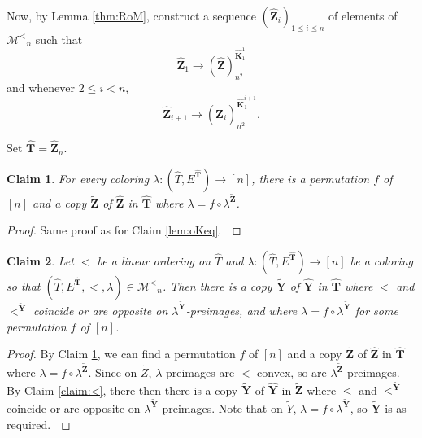 \documentclass[reqno]{amsart}
\newtheorem{claimm}{Claim}
\begin{document}
Now, by Lemma \ref{thm:RoM}, construct a sequence $({\widehat{\textbf{{Z}}}}_i)_{1\leq i \leq n}$ of elements of ${\mathcal{M}^<}_n$ such that \[ {\widehat{\textbf{{Z}}}}_1 {\longrightarrow {{({\widehat{\textbf{{Z}}}})}}^{{{\widehat{\textbf{{K}}}}_1 ^1}}_{{n^2}}} \] and whenever $2\leq i < n$, \[ {\widehat{\textbf{{Z}}}}_{i+1} {\longrightarrow {{({\widehat{\textbf{{Z}}}}_i)}}^{{{\widehat{\textbf{{K}}}}_1 ^{i+1}}}_{{n^2}}}. \] 

Set ${\widehat{\textbf{{T}}}}={\widehat{\textbf{{Z}}}}_{n}$. 

\begin{claimm}
\label{claim:oMeq} 
For every coloring $\lambda : {{(\hat{T}, E^{{\widehat{\textbf{{T}}}}})} \longrightarrow {[n]}}$, there is a permutation $f$ of $[n]$ and a copy ${\widetilde{\textbf{{Z}}}}$ of ${\widehat{\textbf{{Z}}}}$ in ${\widehat{\textbf{{T}}}}$ where $\lambda = f \circ \lambda^{{\widetilde{\textbf{{Z}}}}}$.  
\end{claimm}

\begin{proof} Same proof as for Claim \ref{lem:oKeq}. $\qedhere$ \end{proof}

\begin{claimm}
Let $<$ be a linear ordering on $\hat{T}$ and $\lambda : {{(\hat{T}, E^{{\widehat{\textbf{{T}}}}})} \longrightarrow {[n]}}$ be a coloring so that $(\hat{T}, E^{{\widehat{\textbf{{T}}}}}, <, \lambda) \in {\mathcal{M}^<} _n$. Then there is a copy ${\widetilde{\textbf{{Y}}}}$ of ${\widehat{\textbf{{Y}}}}$ in ${\widehat{\textbf{{T}}}}$ where $<$ and $<^{{\widetilde{\textbf{{Y}}}}}$ coincide or are opposite on $\lambda^{{\widetilde{\textbf{{Y}}}}}$-preimages, and where $\lambda = f \circ \lambda^{{\widetilde{\textbf{{Y}}}}}$ for some permutation $f$ of $[n]$. 
\end{claimm}

\begin{proof}
By Claim \ref{claim:oMeq}, we can find a permutation $f$ of $[n]$ and a copy ${\widetilde{\textbf{{Z}}}}$ of ${\widehat{\textbf{{Z}}}}$ in ${\widehat{\textbf{{T}}}}$ where $\lambda = f \circ \lambda^{{\widetilde{\textbf{{Z}}}}}$. Since on $\tilde{Z}$, $\lambda$-preimages are $<$-convex, so are $\lambda^{{\widetilde{\textbf{{Z}}}}}$-preimages. By Claim \ref{claim:<}, there then there is a copy ${\widetilde{\textbf{{Y}}}}$ of ${\widehat{\textbf{{Y}}}}$ in ${\widetilde{\textbf{{Z}}}}$ where $<$ and $<^{{\widetilde{\textbf{{Y}}}}}$ coincide or are opposite on $\lambda^{{\widetilde{\textbf{{Y}}}}}$-preimages. Note that on $\tilde{Y}$, $\lambda = f \circ \lambda^{{\widetilde{\textbf{{Y}}}}}$, so ${\widetilde{\textbf{{Y}}}}$ is as required. $\qedhere$ \end{proof}
\end{document}
